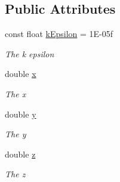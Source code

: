 \subsection*{Public Attributes}
\begin{DoxyCompactItemize}
\item 
const float \hyperlink{struct_unity_engine_1_1_vector3d_a54828fa07f859126d76b230644d59664}{k\+Epsilon} = 1\+E-\/05f
\begin{DoxyCompactList}\small\item\em The k epsilon \end{DoxyCompactList}\item 
double \hyperlink{struct_unity_engine_1_1_vector3d_ab84cc8ded7be8d479f6c04351e604e44}{x}
\begin{DoxyCompactList}\small\item\em The x \end{DoxyCompactList}\item 
double \hyperlink{struct_unity_engine_1_1_vector3d_a03113ffc1771dfcd797c8a626149e1f1}{y}
\begin{DoxyCompactList}\small\item\em The y \end{DoxyCompactList}\item 
double \hyperlink{struct_unity_engine_1_1_vector3d_a328bdd25dcce27f7cd38660ace18f3c3}{z}
\begin{DoxyCompactList}\small\item\em The z \end{DoxyCompactList}\end{DoxyCompactItemize}

